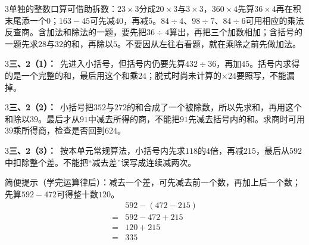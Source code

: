 \documentclass[multi=snippet,border={5bp 20bp 5bp 5bp}]{standalone}
\newenvironment{snippet}[3]{\begin{minipage}{#1bp}\color{answerred}\fontsize{#2}{#3}\selectfont\raggedright}{\end{minipage}}
\begin{document}
\begin{snippet}{505}{11.5}{14}\begin{multicols}{3}\raggedcolumns 单独的整数口算可借助拆数：\(23\times3\)\allowbreak 分成\(20\times3\)\allowbreak 与\(3\times3\)\allowbreak ，\(360\times4\)\allowbreak 先算\(36\times4\)\allowbreak 再在积末尾添一个\(0\)\allowbreak ；\(163-45\)\allowbreak 可先减\(40\)\allowbreak ，再减\(5\)\allowbreak 。\(84\div4\)\allowbreak 、\(98\div7\)\allowbreak 、\(84\div6\)\allowbreak 可用相应的乘法反查商。含加法和除法的一题，要先把\(36\div4\)\allowbreak 算出，再把三个加数相加；含括号的一题先求\(28\)\allowbreak 与\(32\)\allowbreak 的和，再除以\(5\)\allowbreak 。不要因从左往右看题，就在乘除之前先做加法。\end{multicols}\end{snippet}
\begin{snippet}{505}{11.5}{14}\begin{multicols}{3}\raggedcolumns \textbf{三、2（1）：}\ 先进入小括号，但括号内仍要先算\(432\div36\)\allowbreak ，再加\(45\)\allowbreak 。括号内求得的是一个完整的和，最后用这个和乘\(24\)\allowbreak ；脱式时尚未计算的\(\times24\)\allowbreak 要照写，不能漏掉。\end{multicols}\end{snippet}
\begin{snippet}{505}{11.5}{14}\begin{multicols}{3}\raggedcolumns \textbf{三、2（2）：}\ 小括号把\(352\)\allowbreak 与\(272\)\allowbreak 的和合成了一个被除数，所以先求和，再用这个和除以\(39\)\allowbreak 。最后才从\(91\)\allowbreak 中减去所得的商，不能把\(91\)\allowbreak 先减去括号内的和。求商时可用\(39\)\allowbreak 乘所得商，检查是否回到\(624\)\allowbreak 。\end{multicols}\end{snippet}
\begin{snippet}{505}{11.5}{14}\begin{multicols}{3}\raggedcolumns \textbf{三、2（3）：}\ 按本单元常规算法，小括号内先求\(118\)\allowbreak 的\(4\)\allowbreak 倍，再减\(215\)\allowbreak ，最后从\(592\)\allowbreak 中扣除整个差。不能把“减去差”误写成连续减两次。\par 简便提示（学完运算律后）：减去一个差，可先减去前一个数，再加上后一个数；先算\(592-472\)\allowbreak 可得整十数\(120\)\allowbreak 。\[\begin{aligned}&592-(472-215)\\={}&592-472+215\\={}&120+215\\={}&335\end{aligned}\]\end{multicols}\end{snippet}
\end{document}
